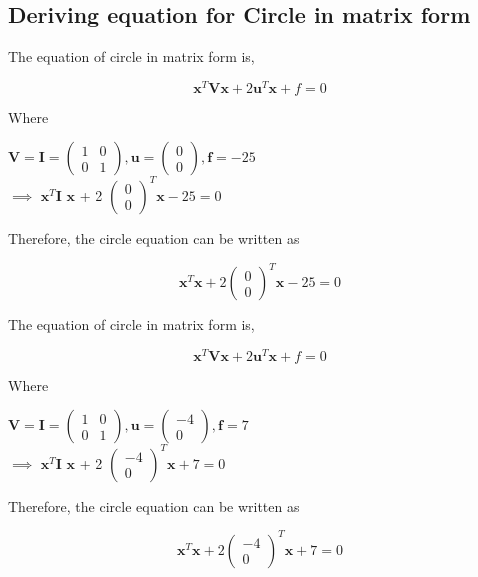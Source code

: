 \documentclass[journal,12pt,twocolumn]{article}
\let\vec\mathbf
\newcommand{\myvec}[1]{\ensuremath{\begin{pmatrix}#1\end{pmatrix}}}
\begin{document}
\subsection{Deriving equation for Circle in matrix form}
\vspace{0.2cm}
\begin{flushleft}
The equation of circle in matrix form is,\\
\vspace{0.25cm}
\end{flushleft}
\vspace{0.25cm}
\begin{equation}
 \vec{x}^T \vec{V} \vec{x} + 2 \vec{u}^T \vec{x} + f = 0
\end{equation}
\begin{flushleft}
Where\\
\end{flushleft}
\center
$\vec{V} = \vec{I}= \myvec{ 1 & 0\\ 0 & 1} , \vec{u} = \myvec{0 \\ 0}, \vec{f}=-25$\\
\endcenter
\center
  $\implies$  $ \vec{x}^T$$\vec{I}$ $\vec{x}$  + 2 $ \myvec{0\\0}^T \vec{x} -25 = 0$
\endcenter
\begin{flushleft}
\vspace{0.23cm}
Therefore, the circle equation can be written as
\end{flushleft}
\begin{equation}
    \vec{x}^T \vec{x} + 2 \myvec{0\\0}^T \vec{x} -25= 0
\end{equation}
\endcenter
\begin{flushleft}
The equation of circle in matrix form is,\\
\vspace{0.25cm}
\end{flushleft}
\vspace{0.25cm}
\begin{equation}
 \vec{x}^T \vec{V} \vec{x} + 2 \vec{u}^T \vec{x} + f = 0
\end{equation}
\begin{flushleft}
Where\\
\end{flushleft}
\center
$\vec{V} = \vec{I}= \myvec{ 1 & 0\\ 0 & 1} , \vec{u} = \myvec{-4 \\ 0}, \vec{f}=7$\\
\endcenter
\center
  $\implies$  $ \vec{x}^T$$\vec{I}$ $\vec{x}$  + 2 $ \myvec{-4\\0}^T \vec{x} +7= 0$
\endcenter
\begin{flushleft}
\vspace{0.23cm}
Therefore, the circle equation can be written as
\end{flushleft}
\begin{equation}
    \vec{x}^T \vec{x} + 2 \myvec{-4\\0}^T \vec{x} +7= 0
\end{equation}
\end{document}
